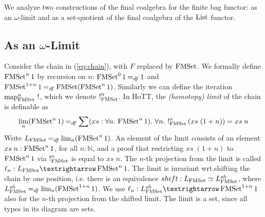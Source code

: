 \documentclass[a4paper,USenglish,cleveref]{lipics-v2021}
\begin{document}
We analyze two constructions of the final coalgebra for the finite bag functor: as an $\omega$-limit %
and as a set-quotient of the final coalgebra of the $\List$ functor. %

\subsection{As an \ensuremath{\omega}-Limit}\label{sec:final-limit-set}

Consider the chain in (\ref{eq:chain}), with $F$ replaced by $\FMSet$. We formally define $\FMSet^n 1$ by recursion on $n$: $\FMSet^0 1 \DefEq 1$ and $\FMSet^{1 + n} 1 \DefEq \FMSet (\FMSet^n 1)$. Similarly we can define the iteration $\Map{\FMSet}^n\,\Bang$, which we denote $\Bang^n_{\FMSet}$.
In HoTT, the \emph{(homotopy) limit} of the chain is definable as
\[
\lim_{n} (\FMSet^n 1) \DefEq \sum (xs : \forall n \Where \FMSet^n 1) \Where \forall n \Where
  \Bang^n_{\FMSet}\,(xs\;(1 + n)) = xs\;n
\]
Write $\Lim{\FMSet} \DefEq \lim_{n} (\FMSet^n 1)$. An element of the limit consists of an element $xs\;n : \FMSet^n 1$, for all $n : ℕ$, and a proof that restricting $xs\;(1 + n)$ to $\FMSet^n 1$ via $\Bang^n_{\FMSet}$ is equal to $xs\;n$. The $n$-th projection from the limit is called $\ell_n : \Lim{\FMSet} → \FMSet^n 1$. The limit is invariant wrt.\@ shifting the chain by one position, i.e. there is an equivalence $\shift : \Lim{\FMSet} \simeq \LimSh{\FMSet}$, where $\LimSh{\FMSet} \DefEq \lim_{n} (\FMSet^{1 + n} 1)$. We use $\ell_n : \LimSh{\FMSet} → \FMSet^{1+n} 1$ also for the $n$-th projection from the shifted limit.
The limit is a set, since all types in its diagram are sets.
\end{document}
